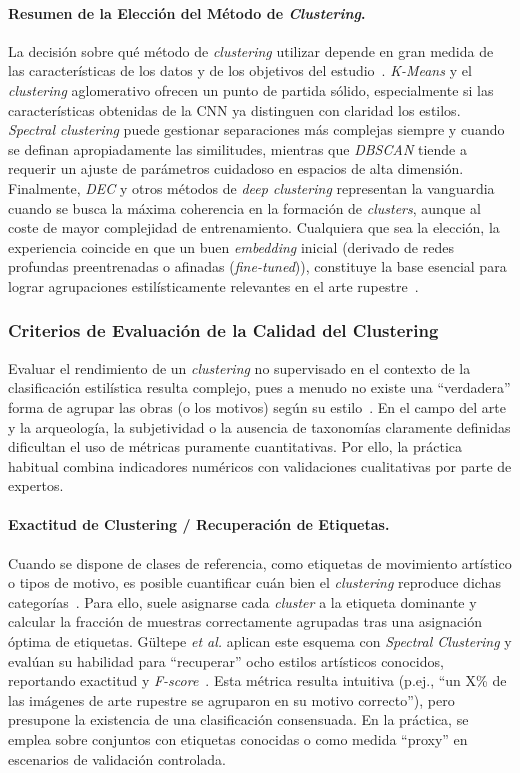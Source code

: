 \paragraph{Resumen de la Elección del Método de \textit{Clustering}.}
La decisión sobre qué método de \textit{clustering} utilizar depende en gran medida de las características de los datos y de los objetivos del estudio~\cite{dangeti2024}.
\textit{K-Means} y el \textit{clustering} aglomerativo ofrecen un punto de partida sólido, especialmente si las características obtenidas de la CNN ya distinguen con claridad los estilos.
\textit{Spectral clustering} puede gestionar separaciones más complejas siempre y cuando se definan apropiadamente las similitudes, mientras que \textit{DBSCAN} tiende a requerir un ajuste de parámetros cuidadoso en espacios de alta dimensión.
Finalmente, \textit{DEC} y otros métodos de \textit{deep clustering} representan la vanguardia cuando se busca la máxima coherencia en la formación de \textit{clusters}, aunque al coste de mayor complejidad de entrenamiento.
Cualquiera que sea la elección, la experiencia coincide en que un buen \textit{embedding} inicial (derivado de redes profundas preentrenadas o afinadas (\textit{fine-tuned})), constituye la base esencial para lograr agrupaciones estilísticamente relevantes en el arte rupestre~\cite{guerin2018,gultepe2018,dangeti2024}.

\subsubsection{Criterios de Evaluación de la Calidad del Clustering }
Evaluar el rendimiento de un \textit{clustering} no supervisado en el contexto de la clasificación estilística resulta complejo, pues a menudo no existe una “verdadera” forma de agrupar las obras (o los motivos) según su estilo~\cite{dangeti2024}.
En el campo del arte y la arqueología, la subjetividad o la ausencia de taxonomías claramente definidas dificultan el uso de métricas puramente cuantitativas.
Por ello, la práctica habitual combina indicadores numéricos con validaciones cualitativas por parte de expertos.

\paragraph{Exactitud de Clustering / Recuperación de Etiquetas.}
Cuando se dispone de clases de referencia, como etiquetas de movimiento artístico o tipos de motivo, es posible cuantificar cuán bien el \textit{clustering} reproduce dichas categorías~\cite{guerin2018}.
Para ello, suele asignarse cada \textit{cluster} a la etiqueta dominante y calcular la fracción de muestras correctamente agrupadas tras una asignación óptima de etiquetas.
Gültepe \textit{et al.} aplican este esquema con \textit{Spectral Clustering} y evalúan su habilidad para “recuperar” ocho estilos artísticos conocidos, reportando exactitud y \textit{F-score}~\cite{gultepe2018}.
Esta métrica resulta intuitiva (p.ej., “un X\% de las imágenes de arte rupestre se agruparon en su motivo correcto”), pero presupone la existencia de una clasificación consensuada.
En la práctica, se emplea sobre conjuntos con etiquetas conocidas o como medida “proxy” en escenarios de validación controlada.

